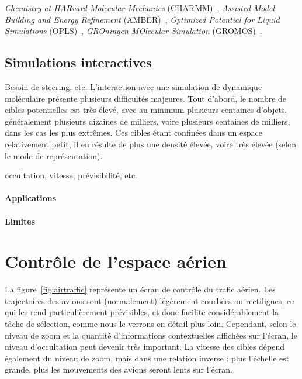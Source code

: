 	\emph{Chemistry at HARvard Molecular Mechanics} (CHARMM)~\cite{brooks1983charmm, brooks2009charmm}, \emph{Assisted Model Building and Energy Refinement} (AMBER)~\cite{cornell1995second, wang2004development}, \emph{Optimized Potential for Liquid Simulations} (OPLS)~\cite{jorgensen1996development, kaminski2001evaluation}, \emph{GROningen MOlecular Simulation} (GROMOS)~\cite{scott1999gromos, oostenbrink2004biomolecular}.
	
    
	\subsection{Simulations interactives}
	Besoin de steering, etc.
	L'interaction avec une simulation de dynamique moléculaire présente plusieurs difficultés majeures. Tout d'abord, le nombre de cibles potentielles est très élevé, avec au minimum plusieurs centaines d'objets, généralement plusieurs dizaines de milliers, voire plusieurs centaines de milliers, dans les cas les plus extrêmes. Ces cibles étant confinées dans un espace relativement petit, il en résulte de plus une densité élevée, voire très élevée (selon le mode de représentation).
	
	occultation, vitesse, prévisibilité, etc.
	 
    \paragraph{Applications}
    
    \paragraph{Limites}
	
	\section{Contrôle de l'espace aérien}
	La figure~\ref{fig:airtraffic} représente un écran de contrôle du trafic aérien. Les trajectoires des avions sont (normalement) légèrement courbées ou rectilignes, ce qui les rend particulièrement prévisibles, et donc facilite considérablement la tâche de sélection, comme nous le verrons en détail plus loin. Cependant, selon le niveau de zoom et la quantité d'informations contextuelles affichées sur l'écran, le niveau d'occultation peut devenir très important. La vitesse des cibles dépend également du niveau de zoom, mais dans une relation inverse : plus l'échelle est grande, plus les mouvements des avions seront lents sur l'écran.
	
